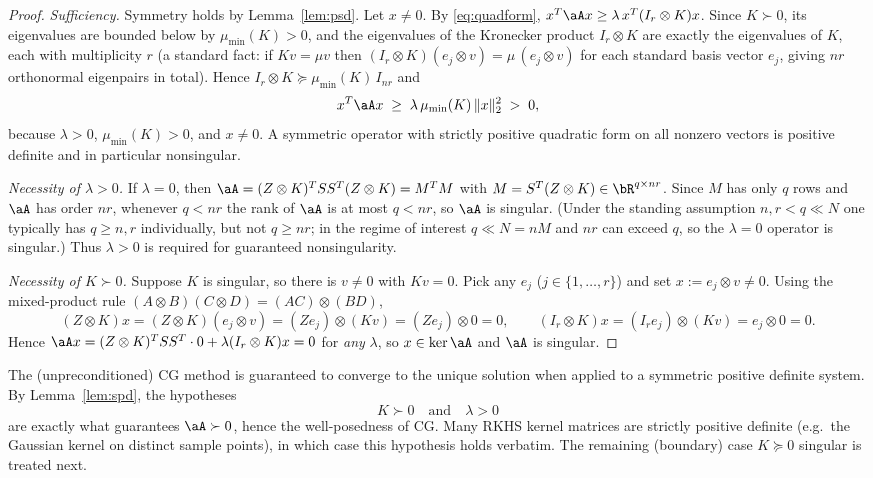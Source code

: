 \begin{proof}
\emph{Sufficiency.} Symmetry holds by Lemma~\ref{lem:psd}. Let $x\neq0$.
By \eqref{eq:quadform},
$x^{T}\aA x \ge \lambda\,x^{T}(I_r\otimes K)x$. Since $K\succ0$, its
eigenvalues are bounded below by $\mu_{\min}(K)>0$, and the eigenvalues of the
Kronecker product $I_r\otimes K$ are exactly the eigenvalues of $K$, each with
multiplicity $r$ (a standard fact: if $K v=\mu v$ then
$(I_r\otimes K)(e_j\otimes v)=\mu\,(e_j\otimes v)$ for each standard basis
vector $e_j$, giving $nr$ orthonormal eigenpairs in total). Hence
$I_r\otimes K\succeq \mu_{\min}(K)\,I_{nr}$ and
\[
  x^{T}\aA x \;\ge\; \lambda\,\mu_{\min}(K)\,\|x\|_2^{2} \;>\;0 ,
\]
because $\lambda>0$, $\mu_{\min}(K)>0$, and $x\neq0$. A symmetric operator
with strictly positive quadratic form on all nonzero vectors is positive
definite and in particular nonsingular.

\smallskip
\emph{Necessity of $\lambda>0$.} If $\lambda=0$, then
$\aA = (Z\otimes K)^{T}SS^{T}(Z\otimes K) = M^{T}M$ with
$M=S^{T}(Z\otimes K)\in\bR^{q\times nr}$. Since $M$ has only $q$ rows and
$\aA$ has order $nr$, whenever $q<nr$ the rank of $\aA$ is at most $q<nr$, so
$\aA$ is singular. (Under the standing assumption $n,r<q\ll N$ one typically
has $q\ge n,r$ individually, but not $q\ge nr$; in the regime of interest
$q\ll N=nM$ and $nr$ can exceed $q$, so the $\lambda=0$ operator is singular.)
Thus $\lambda>0$ is required for guaranteed nonsingularity.

\smallskip
\emph{Necessity of $K\succ0$.} Suppose $K$ is singular, so there is
$v\neq0$ with $Kv=0$. Pick any $e_j$ ($j\in\{1,\dots,r\}$) and set
$x:=e_j\otimes v\neq0$. Using the mixed-product rule
$(A\otimes B)(C\otimes D)=(AC)\otimes(BD)$,
\[
  (Z\otimes K)x=(Z\otimes K)(e_j\otimes v)=(Ze_j)\otimes(Kv)=(Ze_j)\otimes 0=0,
  \qquad
  (I_r\otimes K)x=(I_r e_j)\otimes(Kv)=e_j\otimes 0=0 .
\]
Hence $\aA x=(Z\otimes K)^{T}SS^{T}\cdot 0+\lambda(I_r\otimes K)x=0$ for
\emph{any} $\lambda$, so $x\in\ker\aA$ and $\aA$ is singular.
\end{proof}

\begin{remark}\label{rem:cg}
The (unpreconditioned) CG method is guaranteed to converge to the unique
solution when applied to a symmetric positive definite system. By
Lemma~\ref{lem:spd}, the hypotheses
\[
  \boxed{\;K\succ0\quad\text{and}\quad\lambda>0\;}
\]
are exactly what guarantees $\aA\succ0$, hence the well-posedness of CG.
Many RKHS kernel matrices are strictly positive definite (e.g.\ the Gaussian
kernel on distinct sample points), in which case this hypothesis holds
verbatim. The remaining (boundary) case $K\succeq0$ singular is treated next.
\end{remark}

